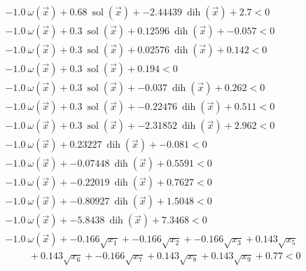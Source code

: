 \documentclass{article} %
\DeclareMathOperator{\sol}{sol}
\DeclareMathOperator{\dih}{dih}
\newcommand{\vx}{\vec{x}}
\begin{document}
\begin{align*}
&-1.0\ \omega(\vx) + 0.68\ \sol(\vx) + -2.44439\ \dih(\vx) + 2.7 < 0 \tag{D\_309781213} \\
&-1.0\ \omega(\vx) + 0.3\ \sol(\vx) + 0.12596\ \dih(\vx) + -0.057 < 0 \tag{D\_546070702} \\
&-1.0\ \omega(\vx) + 0.3\ \sol(\vx) + 0.02576\ \dih(\vx) + 0.142 < 0 \tag{D\_273299220} \\
&-1.0\ \omega(\vx) + 0.3\ \sol(\vx) + 0.194 < 0 \tag{D\_420356876} \\
&-1.0\ \omega(\vx) + 0.3\ \sol(\vx) + -0.037\ \dih(\vx) + 0.262 < 0 \tag{D\_168730298} \\
&-1.0\ \omega(\vx) + 0.3\ \sol(\vx) + -0.22476\ \dih(\vx) + 0.511 < 0 \tag{D\_563211815} \\
&-1.0\ \omega(\vx) + 0.3\ \sol(\vx) + -2.31852\ \dih(\vx) + 2.962 < 0 \tag{D\_923665644} \\
&-1.0\ \omega(\vx) + 0.23227\ \dih(\vx) + -0.081 < 0 \tag{D\_131907821} \\
&-1.0\ \omega(\vx) + -0.07448\ \dih(\vx) + 0.5591 < 0 \tag{D\_632783039} \\
&-1.0\ \omega(\vx) + -0.22019\ \dih(\vx) + 0.7627 < 0 \tag{D\_997560269} \\
&-1.0\ \omega(\vx) + -0.80927\ \dih(\vx) + 1.5048 < 0 \tag{D\_849090707} \\
&-1.0\ \omega(\vx) + -5.8438\ \dih(\vx) + 7.3468 < 0 \tag{D\_741613981} \\
&-1.0\ \omega(\vx) + -0.166 \sqrt{x_1} + -0.166 \sqrt{x_2} + -0.166 \sqrt{x_3} + 0.143 \sqrt{x_5} \\ & \hspace{1cm} + 0.143 \sqrt{x_6} + -0.166 \sqrt{x_7} + 0.143 \sqrt{x_8} + 0.143 \sqrt{x_9} + 0.77 < 0 \tag{D\_319803344} \\
\end{align*} 
\end{document}
